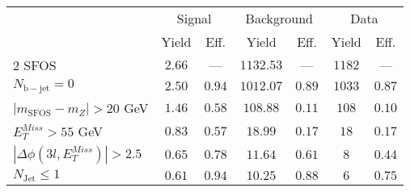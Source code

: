 \begin{tabular}{l||c|c||c|c||c|c}
\hline
 &                 \multicolumn{2}{c||}{Signal}            &  \multicolumn{2}{c||}{Background} &  \multicolumn{2}{c}{Data} \\
   & Yield & Eff. & Yield & Eff. & Yield & Eff.\\
   \hline\hline
   2 SFOS &  $2.66$ &  --- &  $1132.53$ &  --- & $1182$ & ---\\ 
   \hline
   $N_{\mathrm{b-jet}}=0$ &  $2.50$ &  $0.94$ &  $1012.07$ &  $0.89$ & $1033$ &  $0.87$\\ 
   \hline
   $| m_{\mathrm{SFOS}} - m_Z | >  20$ GeV &  $1.46$ &  $0.58$ &  $108.88$ &  $0.11$ & $108$ &  $0.10$\\ 
   \hline
   $E_{T}^{Miss} > 55$ GeV &  $0.83$ &  $0.57$ &  $18.99$ &  $0.17$ & $18$ &  $0.17$\\ 
   \hline
   $|\Delta\phi(3l,E_{T}^{Miss})| > 2.5$ &  $0.65$ &  $0.78$ &  $11.64$ &  $0.61$ & $8$ &  $0.44$\\ 
   \hline
   $N_{\mathrm{Jet}} \leq 1$ &  $0.61$ &  $0.94$ &  $10.25$ &  $0.88$ & $6$ &  $0.75$\\ 
   \hline
   \end{tabular}


